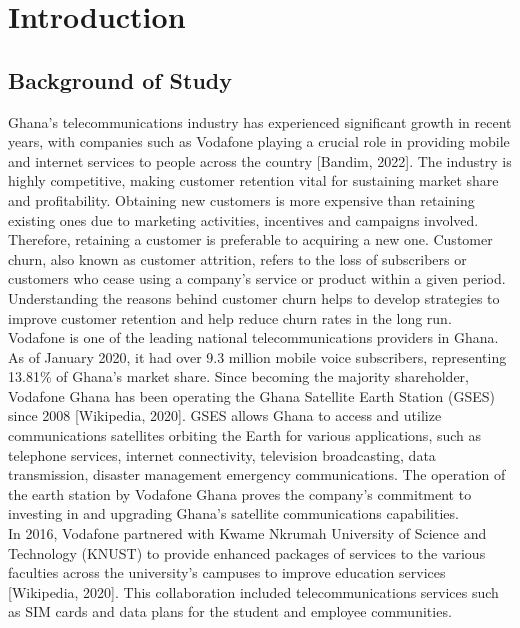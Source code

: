 \documentclass[doublespacing,12pt]{report}
\begin{document}
 




\newpage
\chapter{Introduction}


\section{Background of Study}

Ghana's telecommunications industry has experienced significant growth in recent years, with companies such as Vodafone playing a crucial role in providing mobile and internet services to people across the country [Bandim, 2022]. The industry is highly competitive, making customer retention vital for sustaining market share and profitability. Obtaining new customers is more expensive than retaining existing ones due to marketing activities, incentives and campaigns involved. Therefore, retaining a customer is preferable to acquiring a new one. Customer churn, also known as customer attrition, refers to the loss of subscribers or customers who cease using a company’s service or product within a given period. Understanding the reasons behind customer churn helps to develop strategies to improve customer retention and help reduce churn rates in the long run.\\
Vodafone is one of the leading national telecommunications providers in Ghana. As of January 2020, it had over 9.3 million mobile voice subscribers, representing 13.81\% of Ghana's market share. Since becoming the majority shareholder, Vodafone Ghana has been operating the Ghana Satellite Earth Station (GSES) since 2008 [Wikipedia, 2020]. GSES allows Ghana to access and utilize communications satellites orbiting the Earth for various applications, such as telephone services, internet connectivity, television broadcasting, data transmission, disaster management emergency communications. The operation of the earth station by Vodafone Ghana proves the company's commitment to investing in and upgrading Ghana's satellite communications capabilities.\\
In 2016, Vodafone partnered with Kwame Nkrumah University of Science and Technology (KNUST) to provide enhanced packages of services to the various faculties across the university's campuses to improve education services [Wikipedia, 2020]. This collaboration included telecommunications services such as SIM cards and data plans for the student and employee communities.\\
\end{document}
